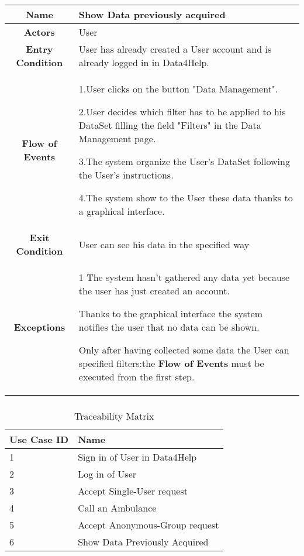       \begin{table}[h!]
        \centering
        \begin{tabularx}{\linewidth}{|c|X|}
          \hline
          \textbf{Name} & Show Data previously acquired\\
        	\hline
        	\textbf{Actors} & User\\
        	\hline
        	\textbf{Entry Condition} & User has already created a User account and is already logged in in Data4Help.\\
        	\hline
        	\textbf{Flow of Events} &
        					1.User clicks on the button "Data Management".

        					2.User decides which filter has to be applied to his DataSet filling the field "Filters" in the Data 						Management page.

        					3.The system organize the User's DataSet following the User's instructions.

        					4.The system show to the User these data thanks to a graphical interface. \\
        	\hline
        	\textbf{Exit Condition} & User can see his data in the specified way\\

        	\hline
        	\textbf{Exceptions} & 1 The system hasn't gathered any data yet because the user has just created an account.

        				Thanks to the graphical interface the system notifies the user that no data can be shown.

        				Only after having collected some data the User can specified filters:the \textbf{Flow of Events} must be 				executed from the first step.\\

          \hline
        \end{tabularx}
      \end{table}

    \subsubsection{}

      \begin{table}[h!]
        \centering
        \begin{tabularx}{\linewidth}{|X|X|}
          \hline
          \textbf{Use Case ID} & \textbf{Name}  \\
        	\hline
        	1 & Sign in of User in Data4Help\\
        	\hline
        	2 & Log in of User\\
        	\hline
        	3 & Accept Single-User request\\
        	\hline
        	4 & Call an Ambulance\\
        	\hline
        	5 & Accept Anonymous-Group request\\
        	\hline
        	6 & Show Data Previously Acquired\\
          \hline
  	    \end{tabularx}
        \caption{Traceability Matrix}
      \end{table}

